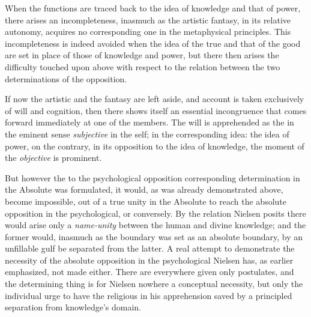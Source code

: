 \documentclass[12pt,a4paper]{book}
\begin{document}
When the functions are traced back to the idea of knowledge and that of power, there arises an
incompleteness, inasmuch as the artistic fantasy, in its relative autonomy, acquires no
corresponding one in the metaphysical principles. This incompleteness is indeed avoided when the
idea of the true and that of the good are set in place of those of knowledge and power, but there
then arises the difficulty touched upon above with respect to the relation between the two
determinations of the opposition.

If now the artistic and the fantasy are left aside, and account is taken exclusively of will and
cognition, then there shows itself an essential incongruence that comes forward immediately at one
of the members. The will is apprehended as the in the eminent sense \emph{subjective} in the self;
in the corresponding idea: the idea of power, on the contrary, in its opposition to the idea of
knowledge, the moment of the \emph{objective} is prominent.

But however the to the psychological opposition corresponding determination in the Absolute was
formulated, it would, as was already demonstrated above, become impossible, out of a true unity in
the Absolute to reach the absolute opposition in the psychological, or conversely. By the relation
Nielsen posits there would arise only a \emph{name-unity} between the human and divine knowledge;
and the former would, inasmuch as the boundary was set as an absolute boundary, by an unfillable
gulf be separated from the latter. A real attempt to demonstrate the necessity of the absolute
opposition in the psychological Nielsen has, as earlier emphasized, not made either. There are
everywhere given only postulates, and the determining thing is for Nielsen nowhere a conceptual
necessity, but only the individual urge to have the religious in his apprehension saved by a
principled separation from knowledge's domain.
\end{document}
